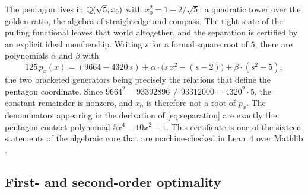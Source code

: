 \begin{remark}\label{rem:worlds}
The pentagon lives in $\mathbb{Q}(\sqrt5,x_0)$ with $x_0^2=1-2/\sqrt5$: a quadratic tower over the golden ratio, the algebra of straightedge and compass. The tight state of the pulling functional leaves that world altogether, and the separation is certified by an explicit ideal membership. Writing $s$ for a formal square root of $5$, there are polynomials $\alpha$ and $\beta$ with
\begin{equation}\label{eq:separation}
  125\,p_x(x)=(9664-4320\,s)+\alpha\cdot\bigl(s\,x^2-(s-2)\bigr)+\beta\cdot(s^2-5),
\end{equation}
the two bracketed generators being precisely the relations that define the pentagon coordinate. Since $9664^2=93392896\neq93312000=4320^2\cdot5$, the constant remainder is nonzero, and $x_0$ is therefore not a root of $p_x$. The denominators appearing in the derivation of \eqref{eq:separation} are exactly the pentagon contact polynomial $5x^4-10x^2+1$. This certificate is one of the sixteen statements of the algebraic core that are machine-checked in Lean~4 over Mathlib \cite{mathlib2020}.
\end{remark}

\subsection{First- and second-order optimality}

